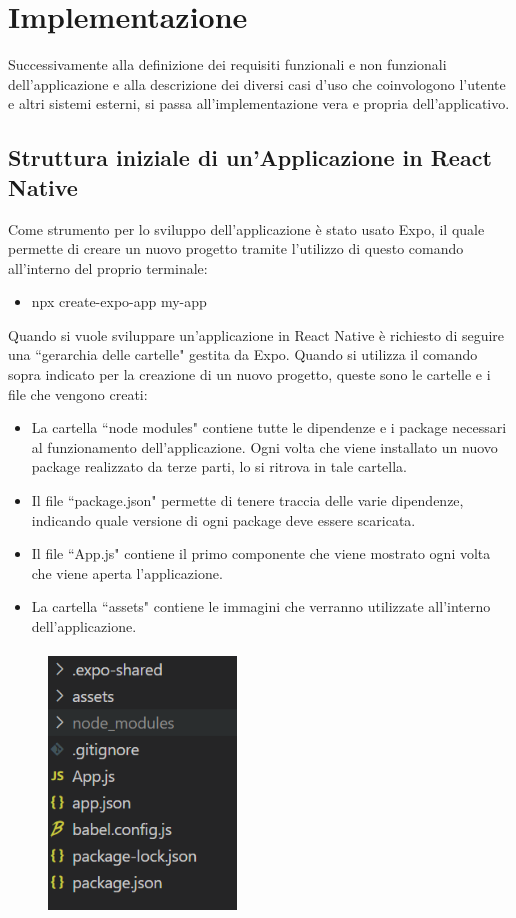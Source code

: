 \chapter{Implementazione}
Successivamente alla definizione dei requisiti funzionali e non funzionali dell'applicazione e alla descrizione dei diversi casi d'uso che coinvologono l'utente e altri sistemi esterni, si passa all'implementazione vera e propria dell'applicativo.
\section{Struttura iniziale di un'Applicazione in React Native}
Come strumento per lo sviluppo dell'applicazione \`e stato usato Expo, il quale permette di creare un nuovo progetto tramite l'utilizzo di questo comando all'interno del proprio terminale:
\begin{itemize}
    \item npx create-expo-app my-app
\end{itemize}
Quando si vuole sviluppare un'applicazione in React Native \`e richiesto di seguire una ``gerarchia delle cartelle" gestita da Expo. Quando si utilizza il comando sopra indicato per la creazione di un nuovo progetto,
queste sono le cartelle e i file che vengono creati:
\begin{itemize}
    \item La cartella ``node modules" contiene tutte le dipendenze e i package necessari al funzionamento dell'applicazione. Ogni volta che viene installato un nuovo package realizzato da terze parti, lo si ritrova in tale cartella.
    \item Il file ``package.json" permette di tenere traccia delle varie dipendenze, indicando quale versione di ogni package deve essere scaricata.
    \item Il file ``App.js" contiene il primo componente che viene mostrato ogni volta che viene aperta l'applicazione.
    \item La cartella ``assets" contiene le immagini che verranno utilizzate all'interno dell'applicazione.
\end{itemize}
\begin{figure}[h]
    \centering
    \includegraphics[width=5cm, height=7cm]{images/ExpoFileCartelle.png}
    \caption[differenzeiteot]{}
    \label{fig:ExpoCartelleFile}
\end{figure}
